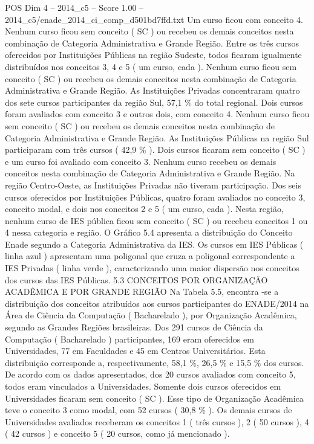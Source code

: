 \begin{textsample}{POS Dim 4 – 2014\_c5 – Score 1.00 – 2014\_c5/enade\_2014\_ci\_comp\_d501bd7ffd.txt}
Um curso ficou com conceito 4.
Nenhum curso ficou sem conceito ( SC ) ou recebeu os demais conceitos nesta combinação de Categoria Administrativa e Grande Região.
Entre os três cursos oferecidos por Instituições Públicas na região Sudeste, todos ficaram igualmente distribuídos nos conceitos 3, 4 e 5 ( um curso, cada ).
Nenhum curso ficou sem conceito ( SC ) ou recebeu os demais conceitos nesta combinação de Categoria Administrativa e Grande Região.
As Instituições Privadas concentraram quatro dos sete cursos participantes da região Sul, 57,1 \% do total regional.
Dois cursos foram avaliados com conceito 3 e outros dois, com conceito 4.
Nenhum curso ficou sem conceito ( SC ) ou recebeu os demais conceitos nesta combinação de Categoria Administrativa e Grande Região.
As Instituições Públicas na região Sul participaram com três cursos ( 42,9 \% ).
Dois cursos ficaram sem conceito ( SC ) e um curso foi avaliado com conceito 3.
Nenhum curso recebeu os demais conceitos nesta combinação de Categoria Administrativa e Grande Região.
Na região Centro-Oeste, as Instituições Privadas não tiveram participação.
Dos seis cursos oferecidos por Instituições Públicas, quatro foram avaliados no conceito 3, conceito modal, e dois nos conceitos 2 e 5 ( um curso, cada ).
Nesta região, nenhum curso de IES pública ficou sem conceito ( SC ) ou recebeu conceitos 1 ou 4 nessa categoria e região.
O Gráfico 5.4 apresenta a distribuição do Conceito Enade segundo a Categoria Administrativa da IES.
Os cursos em IES Públicas ( linha azul ) apresentam uma poligonal que cruza a poligonal correspondente a IES Privadas ( linha verde ), caracterizando uma maior dispersão nos conceitos dos cursos das IES Públicas. 5.3 CONCEITOS POR ORGANIZAÇÃO ACADÊMICA E POR GRANDE REGIÃO Na Tabela 5.5, encontra -se a distribuição dos conceitos atribuídos aos cursos participantes do ENADE/2014 na Área de Ciência da Computação ( Bacharelado ), por Organização Acadêmica, segundo as Grandes Regiões brasileiras.
Dos 291 cursos de Ciência da Computação ( Bacharelado ) participantes, 169 eram oferecidos em Universidades, 77 em Faculdades e 45 em Centros Universitários.
Esta distribuição corresponde a, respectivamente, 58,1 \%, 26,5 \% e 15,5 \% dos cursos.
De acordo com os dados apresentados, dos 20 cursos avaliados com conceito 5, todos eram vinculados a Universidades.
Somente dois cursos oferecidos em Universidades ficaram sem conceito ( SC ).
Esse tipo de Organização Acadêmica teve o conceito 3 como modal, com 52 cursos ( 30,8 \% ).
Os demais cursos de Universidades avaliados receberam os conceitos 1 ( três cursos ), 2 ( 50 cursos ), 4 ( 42 cursos ) e conceito 5 ( 20 cursos, como já mencionado ).

\end{textsample}

